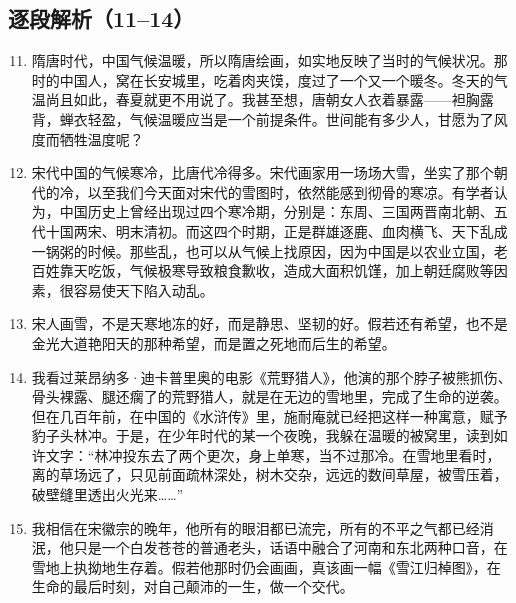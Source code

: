 \begin{handoutlayout}

\section*{逐段解析（11--14）}

\begin{enumerate}[leftmargin=*,label=\protect\circnum{\arabic*},labelsep=0.8em,itemsep=0.9em]
\setcounter{enumi}{10}

\item 隋唐时代，中国气候温暖，所以隋唐绘画，如实地反映了当时的气候状况。那时的中国人，窝在长安城里，吃着肉夹馍，度过了一个又一个暖冬。冬天的气温尚且如此，春夏就更不用说了。我甚至想，唐朝女人衣着暴露——袒胸露背，蝉衣轻盈，气候温暖应当是一个前提条件。世间能有多少人，甘愿为了风度而牺牲温度呢？

\item 宋代中国的气候寒冷，比唐代冷得多。宋代画家用一场场大雪，坐实了那个朝代的冷，以至我们今天面对宋代的雪图时，依然能感到彻骨的寒凉。有学者认为，中国历史上曾经出现过四个寒冷期，分别是：东周、三国两晋南北朝、五代十国两宋、明末清初。而这四个时期，正是群雄逐鹿、血肉横飞、天下乱成一锅粥的时候。那些乱，也可以从气候上找原因，因为中国是以农业立国，老百姓靠天吃饭，气候极寒导致粮食歉收，造成大面积饥馑，加上朝廷腐败等因素，很容易使天下陷入动乱。

\item 宋人画雪，不是天寒地冻的好，而是静思、坚韧的好。假若还有希望，也不是金光大道艳阳天的那种希望，而是置之死地而后生的希望。

\item 我看过莱昂纳多·迪卡普里奥的电影《荒野猎人》，他演的那个脖子被熊抓伤、骨头裸露、腿还瘸了的荒野猎人，就是在无边的雪地里，完成了生命的逆袭。但在几百年前，在中国的《水浒传》里，施耐庵就已经把这样一种寓意，赋予豹子头林冲。于是，在少年时代的某一个夜晚，我躲在温暖的被窝里，读到如许文字：“林冲投东去了两个更次，身上单寒，当不过那冷。在雪地里看时，离的草场远了，只见前面疏林深处，树木交杂，远远的数间草屋，被雪压着，破壁缝里透出火光来……”

\item 我相信在宋徽宗的晚年，他所有的眼泪都已流完，所有的不平之气都已经消泯，他只是一个白发苍苍的普通老头，话语中融合了河南和东北两种口音，在雪地上执拗地生存着。假若他那时仍会画画，真该画一幅《雪江归棹图》，在生命的最后时刻，对自己颠沛的一生，做一个交代。

\end{enumerate}

\switchcolumn


\end{handoutlayout}

